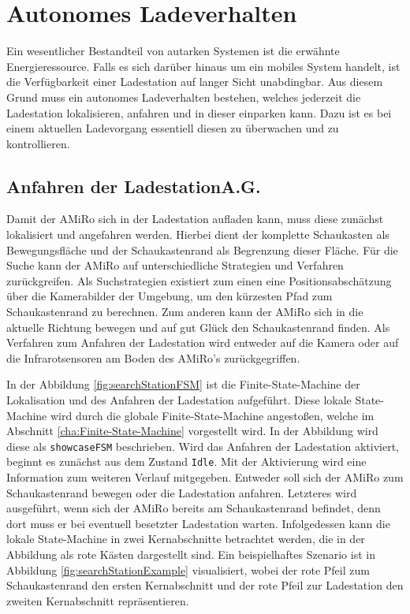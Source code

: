 \chapter[Autonomes Ladeverhalten]{Autonomes Ladeverhalten \hfill{}} \label{kap:AutonomesLadeverhalten}
Ein wesentlicher Bestandteil von autarken Systemen ist die erwähnte Energieressource. Falls es sich darüber hinaus um ein mobiles System handelt, ist die Verfügbarkeit einer Ladestation auf langer Sicht unabdingbar. Aus diesem Grund muss ein autonomes Ladeverhalten bestehen, welches jederzeit die Ladestation lokalisieren, anfahren und in dieser einparken kann. Dazu ist es bei einem aktuellen Ladevorgang essentiell diesen zu überwachen und zu kontrollieren.

\section[Anfahren der Ladestation]{Anfahren der Ladestation\hfill {\normalsize A.G.}} \label{cha:Anfahren der Ladestation} %
Damit der AMiRo sich in der Ladestation aufladen kann, muss diese zunächst lokalisiert und angefahren werden. Hierbei dient der komplette Schaukasten als Bewegungsfläche und der Schaukastenrand als Begrenzung dieser Fläche. Für die Suche kann der AMiRo auf unterschiedliche Strategien und Verfahren zurückgreifen. Als Suchstrategien existiert zum einen eine Positionsabschätzung über die Kamerabilder der Umgebung, um den kürzesten Pfad zum Schaukastenrand zu berechnen. Zum anderen kann der AMiRo sich in die aktuelle Richtung bewegen und auf gut Glück den Schaukastenrand finden. Als Verfahren zum Anfahren der Ladestation wird entweder auf die Kamera oder auf die Infrarotsensoren am Boden des AMiRo's zurückgegriffen.

In der Abbildung \ref{fig:searchStationFSM} ist die Finite-State-Machine der Lokalisation und des Anfahren der Ladestation aufgeführt. Diese lokale State-Machine wird durch die globale Finite-State-Machine angestoßen, welche im Abschnitt \ref{cha:Finite-State-Machine} vorgestellt wird. In der Abbildung wird diese als \texttt{showcaseFSM} beschrieben. Wird das Anfahren der Ladestation aktiviert, beginnt es zunächst aus dem Zustand \texttt{Idle}. Mit der Aktivierung wird eine Information zum weiteren Verlauf mitgegeben. Entweder soll sich der AMiRo zum Schaukastenrand bewegen oder die Ladestation anfahren. Letzteres wird ausgeführt, wenn sich der AMiRo bereits am Schaukastenrand befindet, denn dort muss er bei eventuell besetzter Ladestation warten. Infolgedessen kann die lokale State-Machine in zwei Kernabschnitte betrachtet werden, die in der Abbildung als rote Kästen dargestellt sind. Ein beispielhaftes Szenario ist in Abbildung \ref{fig:searchStationExample} visualisiert, wobei der rote Pfeil zum Schaukastenrand den ersten Kernabschnitt und der rote Pfeil zur Ladestation den zweiten Kernabschnitt repräsentieren.

